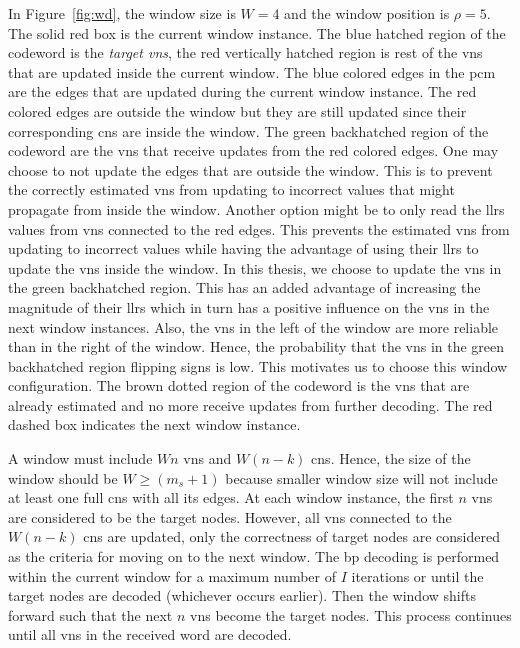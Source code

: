 In Figure~\ref{fig:wd}, the window size is $W=4$ and the window position is $\rho=5$. The solid red box is the current window instance. The blue hatched region of the codeword is the \emph{target \acp{vn}}, the red vertically hatched region is rest of the \acp{vn} that are updated inside the current window. The blue colored edges in the \ac{pcm} are the edges that are updated during the current window instance. The red colored edges are outside the window but they are still updated since their corresponding \acp{cn} are inside the window. The green backhatched region of the codeword are the \acp{vn} that receive updates from the red colored edges. One may choose to not update the edges that are outside the window. This is to prevent the correctly estimated \acp{vn} from updating to incorrect values that might propagate from inside the window. Another option might be to only read the \acp{llr} values from \acp{vn} connected to the red edges. This prevents the estimated \acp{vn} from updating to incorrect values while having the advantage of using their \acp{llr} to update the \acp{vn} inside the window. In this thesis, we choose to update the \acp{vn} in the green backhatched region. This has an added advantage of increasing the magnitude of their \acp{llr} which in turn has a positive influence on the \acp{vn} in the next window instances. Also, the \acp{vn} in the left of the window are more reliable than in the right of the window. Hence, the probability that the \acp{vn} in the green backhatched region flipping signs is low. This motivates us to choose this window configuration. The brown dotted region of the codeword is the \acp{vn} that are already estimated and no more receive updates from further decoding. The red dashed box indicates the next window instance. 

A window must include $Wn$ \acp{vn} and $W(n-k)$ \acp{cn}. Hence, the size of the window should be $W\geq (m_s+1)$ because smaller window size will not include at least one full \acp{cn} with all its edges. At each window instance, the first $n$ \acp{vn} are considered to be the target nodes. However, all \acp{vn} connected to the $W(n-k)$ \acp{cn} are updated, only the correctness of target nodes are considered as the criteria for moving on to the next window. The \ac{bp} decoding is performed within the current window for a maximum number of $I$ iterations or until the target nodes are decoded (whichever occurs earlier). Then the window shifts forward such that the next $n$ \acp{vn} become the target nodes. This process continues until all \acp{vn} in the received word are decoded.

